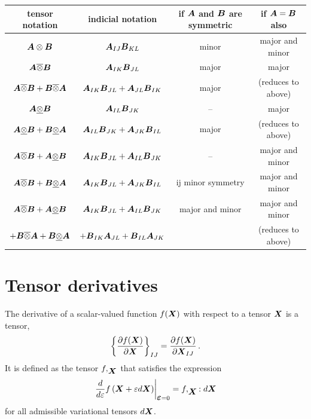 \documentclass[10pt,letterpaper,oneside]{report}
\newcommand{\ten}[1]{\mbox{\boldmath $#1$}{}}
\begin{document}
\begin{center}
\renewcommand{\arraystretch}{1.5}
\begin{tabular}{|c|c|c|c|} \hline
tensor notation & indicial notation & if $\ten{A}$ and $\ten{B}$ are symmetric & if $\ten{A} = \ten{B}$ also \\ \hline 
$\ten{A} \otimes \ten{B}$ & $\ten{A}_{IJ} \ten{B}_{KL}$ & minor & major and minor 
\\ \hline
$\ten{A} \overline{\otimes} \ten{B}$ & $\ten{A}_{IK} \ten{B}_{JL}$ & major & major 
\\ \hline
$\ten{A} \overline{\otimes} \ten{B} + \ten{B} \overline{\otimes} \ten{A}$ & $\ten{A}_{IK} \ten{B}_{JL} + \ten{A}_{JL} \ten{B}_{IK}$ & major & (reduces to above) 
\\ \hline
$\ten{A} \underline{\otimes} \ten{B}$ & $\ten{A}_{IL} \ten{B}_{JK}$ & -- & major 
\\ \hline
$\ten{A} \underline{\otimes} \ten{B} + \ten{B} \underline{\otimes} \ten{A}$ & $\ten{A}_{IL} \ten{B}_{JK} + \ten{A}_{JK} \ten{B}_{IL}$ & major & (reduces to above) 
\\ \hline
$\ten{A} \overline{\otimes} \ten{B} + \ten{A} \underline{\otimes} \ten{B}$ & $\ten{A}_{IK} \ten{B}_{JL} + \ten{A}_{IL} \ten{B}_{JK}$ & -- & major and minor 
\\ \hline
$\ten{A} \overline{\otimes} \ten{B} + \ten{B} \underline{\otimes} \ten{A}$ & $\ten{A}_{IK} \ten{B}_{JL} + \ten{A}_{JK} \ten{B}_{IL}$ & ij minor symmetry & major and minor 
\\ \hline
$\ten{A} \overline{\otimes} \ten{B} + \ten{A} \underline{\otimes} \ten{B}$ & $\ten{A}_{IK} \ten{B}_{JL} + \ten{A}_{IL} \ten{B}_{JK}$ & major and minor & major and minor \\
$ + \ten{B} \overline{\otimes} \ten{A} + \ten{B} \underline{\otimes} \ten{A}$ & $ + \ten{B}_{IK} \ten{A}_{JL} + \ten{B}_{IL} \ten{A}_{JK}$ &  & (reduces to above) 
\\ \hline
\end{tabular} 
\end{center}
\renewcommand{\arraystretch}{1.0}


\newpage
\section{Tensor derivatives}
\label{sec:tensorderivatives}
The derivative of a scalar-valued function $f ( \ten{X} )$ with respect to a tensor $\ten{X}$ is a tensor,
\begin{equation}
\left\lbrace \frac{\partial f ( \ten{X} ) }{\partial \ten{X}} \right\rbrace_{IJ} = \frac{\partial f ( \ten{X} ) }{\partial \ten{X}_{IJ}} \, .
\end{equation}
It is defined as the tensor $f,_{\ten{X}}$ that satisfies the expression
\begin{equation}
\left. \frac{d}{d \varepsilon} f \left( \ten{X} + \varepsilon d\ten{X} \right) \right|_{\ten{\varepsilon}=0} = f,_{\ten{X}} : d \ten{X} 
\end{equation}
for all admissible variational tensors $d \ten{X}$. 
\end{document}
